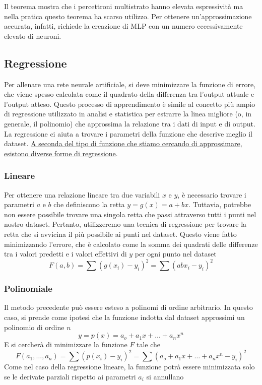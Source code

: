 Il teorema mostra che i percettroni multistrato hanno elevata espressività ma nella pratica questo teorema ha scarso utilizzo. Per ottenere un'approssimazione accurata, infatti, richiede la creazione di MLP con un numero eccessivamente elevato di neuroni.


\subsection{Regressione}
Per allenare una rete neurale artificiale, si deve minimizzare la funzione di errore, che viene spesso calcolata come il quadrato della differenza tra l'output attuale e l'output atteso. Questo processo di apprendimento è simile al concetto più ampio di regressione utilizzato in analisi e statistica per estrarre la linea migliore (o, in generale, il polinomio) che approssima la relazione tra i dati di input e di output. La regressione ci aiuta a trovare i parametri della funzione che descrive meglio il dataset. \uline{A seconda del tipo di funzione che stiamo cercando di approssimare, esistono diverse forme di regressione}.

\subsubsection{Lineare}
Per ottenere una relazione lineare tra due variabili $x$ e $y$, è necessario trovare i parametri $a$ e $b$ che definiscono la retta $y = g(x) = a + bx$. Tuttavia, potrebbe non essere possibile trovare una singola retta che passi attraverso tutti i punti nel nostro dataset. Pertanto, utilizzeremo una tecnica di regressione per trovare la retta che si avvicina il più possibile ai punti nel dataset. Questo viene fatto minimizzando l'errore, che è calcolato come la somma dei quadrati delle differenze tra i valori predetti e i valori effettivi di $y$ per ogni punto nel dataset
$$F(a,b) = \sum(g(x_i) - y_i)^2 = \sum(abx_i - y_i)^2$$

\subsubsection{Polinomiale}
Il metodo precedente può essere esteso a polinomi di ordine arbitrario. In questo caso, si prende come ipotesi che la funzione indotta dal dataset approssimi un polinomio di ordine $n$
$$y = p(x) = a_o + a_1x + \dots + a_nx^n$$
E si cercherà di minimizzare la funzione $F$ tale che
$$ F(a_1,\dots,a_n) = \sum(p(x_i) - y_i)^2 = \sum(a_o + a_1x + \dots + a_nx^n -y_i)^2$$
Come nel caso della regressione lineare, la funzione potrà essere minimizzata solo se le derivate parziali rispetto ai parametri $a_i$ si annullano

